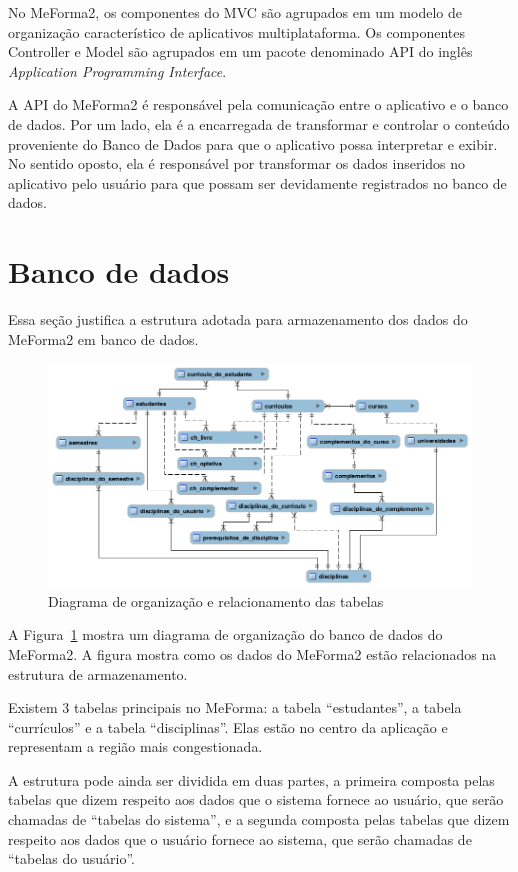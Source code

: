 No MeForma2, os componentes do MVC são agrupados em um modelo de organização característico de aplicativos multiplataforma. Os componentes Controller e Model são agrupados em um pacote denominado API do inglês \textit{Application Programming Interface}.

A API do MeForma2 é responsável pela comunicação entre o aplicativo e o banco de dados. Por um lado, ela é a encarregada de transformar e controlar o conteúdo proveniente do Banco de Dados para que o aplicativo possa interpretar e exibir. No sentido oposto, ela é responsável por transformar os dados inseridos no aplicativo pelo usuário para que possam ser devidamente registrados no banco de dados.

\section{Banco de dados}

Essa seção justifica a estrutura adotada para armazenamento dos dados do MeForma2 em banco de dados.

\begin{figure}[H]
	   \centering
	   		\includegraphics[scale=0.50]{pics/c3/4-db.png}
	   \caption{Diagrama de organização e relacionamento das tabelas}
	   \label{db}
\end{figure}

A Figura~\ref{db} mostra um diagrama de organização do banco de dados do MeForma2. A figura mostra como os dados do MeForma2 estão relacionados na estrutura de armazenamento.

Existem 3 tabelas principais no MeForma: a tabela ``estudantes'', a tabela ``currículos'' e a tabela ``disciplinas''. Elas estão no centro da aplicação e representam a região mais congestionada.

A estrutura pode ainda ser dividida em duas partes, a primeira composta pelas tabelas que dizem respeito aos dados que o sistema fornece ao usuário, que serão chamadas de ``tabelas do sistema'', e a segunda composta pelas tabelas que dizem respeito aos dados que o usuário fornece ao sistema, que serão chamadas de ``tabelas do usuário''.

